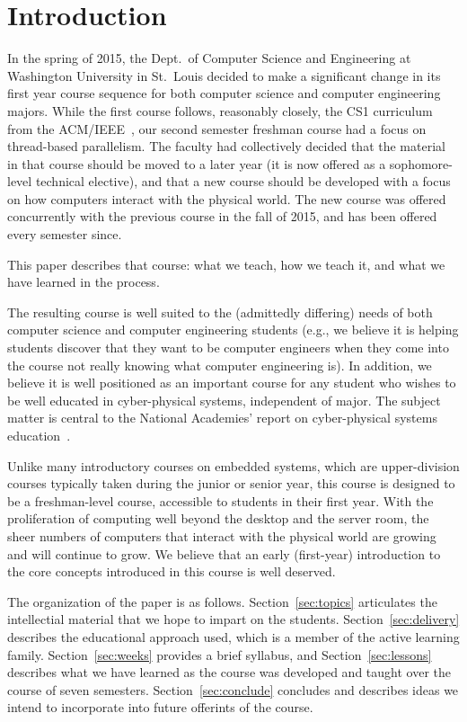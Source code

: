 \section{Introduction}
\label{sec:intro}

In the spring of 2015, the Dept.~of Computer Science and Engineering at
Washington University in St.~Louis decided to make a significant change
in its first year course sequence for both computer science and
computer engineering majors.  While the first course follows, reasonably
closely, the CS1 curriculum from the ACM/IEEE~\cite{cs13}, our second semester
freshman course had a focus on thread-based parallelism.  The faculty
had collectively decided that the material in that course should be moved
to a later year (it is now offered as a sophomore-level technical elective),
and that a new course should be developed with a focus on how computers
interact with the physical world.
The new course was offered concurrently with the previous course in the
fall of 2015, and has been offered every semester since.

This paper describes that course: what we teach, how we teach it, and
what we have learned in the process.

The resulting course is well suited to the (admittedly differing) needs of
both computer science and computer
engineering students (e.g., we believe it is helping students discover
that they want to be computer engineers when they come into the course
not really knowing what computer engineering is).
In addition, we believe it is well positioned as an important course for
any student who wishes to be well educated in cyber-physical systems,
independent of major.
The subject matter is central to the National Academies' report on
cyber-physical systems education~\cite{nasem16}.

Unlike many introductory courses on embedded systems, which are upper-division
courses typically taken during the junior or senior year, this course is
designed to be a freshman-level course, accessible to students in their
first year. With the proliferation of
computing well beyond the desktop and the server room, the sheer numbers
of computers that interact with the physical world are growing and
will continue to grow.
We believe that an early (first-year) introduction to the core concepts
introduced in this course is well deserved.

The organization of the paper is as follows.  Section~\ref{sec:topics}
articulates the intellectial material that we hope to impart on the
students.  
Section~\ref{sec:delivery} describes the educational approach used,
which is a member of the active learning family.
Section~\ref{sec:weeks} provides a brief syllabus, and
Section~\ref{sec:lessons} describes what we have learned as the course
was developed and taught over the course of seven semesters.
Section~\ref{sec:conclude} concludes and describes ideas we intend
to incorporate into future offerints of the course.
